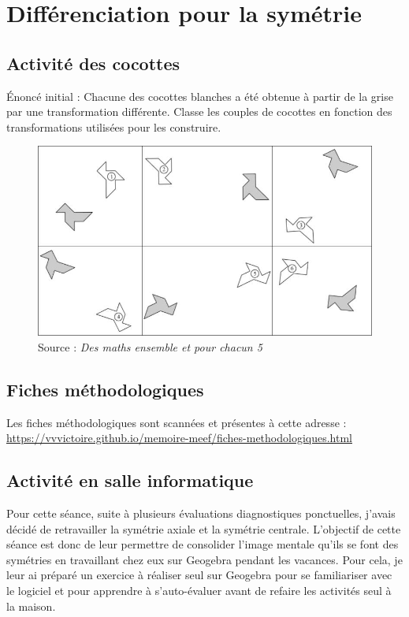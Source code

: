 \section{Différenciation pour la symétrie}

\subsection{Activité des cocottes}\label{annexe:symetrie-act}

Énoncé initial : Chacune des cocottes blanches a été obtenue à partir de la grise par une transformation différente.  Classe les couples de cocottes en fonction des transformations utilisées pour les construire. 

\begin{figure}[h!]
    \centering
    \includegraphics[width=0.9\linewidth]{img/activitemepcc.jpg}
    \caption{Source : \textit{Des maths ensemble et pour chacun 5}}
    \label{fig:angles-fiche1}
\end{figure}

\subsection{Fiches méthodologiques}\label{annexe:symetrie-fiches}

Les fiches méthodologiques sont scannées et présentes à cette adresse : \url{https://vvvictoire.github.io/memoire-meef/fiches-methodologiques.html}

\subsection{Activité en salle informatique}\label{annexe:symetrie-tice}

Pour cette séance, suite à plusieurs évaluations diagnostiques ponctuelles, j'avais décidé de retravailler la symétrie axiale et la symétrie centrale. L'objectif de cette séance est donc de leur permettre de consolider l'image mentale qu'ils se font des symétries en travaillant chez eux sur Geogebra pendant les vacances. Pour cela, je leur ai préparé un exercice à réaliser seul sur Geogebra pour se familiariser avec le logiciel et pour apprendre à s'auto-évaluer avant de refaire les activités seul à la maison.

